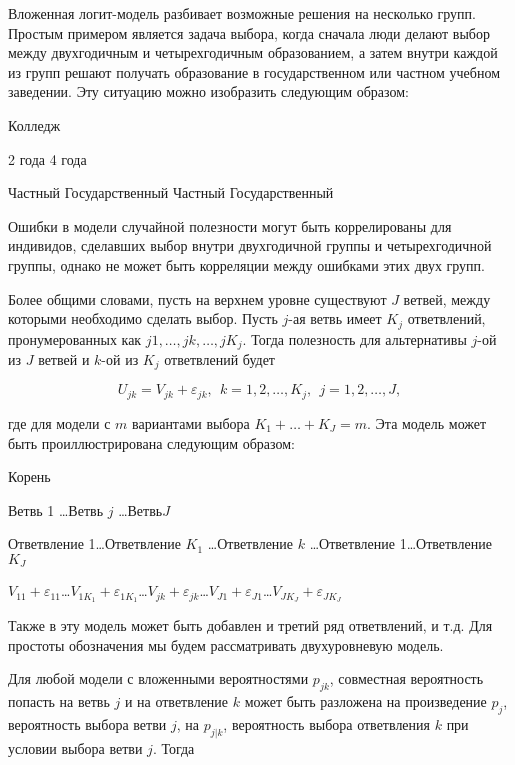 Вложенная логит-модель разбивает возможные решения на несколько групп. Простым примером является задача выбора, когда сначала люди делают выбор между двухгодичным и четырехгодичным образованием, а затем внутри каждой из групп решают получать образование в государственном или частном учебном заведении. Эту ситуацию можно изобразить следующим образом:


Колледж

2 года               4 года

Частный Государственный Частный Государственный



Ошибки в модели случайной полезности могут быть коррелированы для индивидов, сделавших выбор внутри двухгодичной группы  и четырехгодичной группы, однако не может быть корреляции между ошибками этих двух групп.

Более общими словами, пусть на верхнем уровне существуют $J$ ветвей, между которыми необходимо сделать выбор. Пусть $j$-ая ветвь имеет $K_j$ ответвлений, пронумерованных как $j1,\dots ,jk,\dots ,jK_j.$ Тогда полезность для альтернативы $j$-ой из $J$ ветвей и $k$-ой из $K_j$ ответвлений будет

\begin{equation} \label{GrindEQ__15_32_} U_{jk}=V_{jk}+{\varepsilon }_{jk},\ \ k=1,2,\dots ,K_j,\ \ j=1,2,\dots ,J, \end{equation} 

где для модели с $m$ вариантами выбора $K_1+\dots +K_J=m.$ Эта модель может быть проиллюстрирована следующим образом:

Корень



Ветвь 1  \dots  Ветвь $j$ \dots  Ветвь$J$



Ответвление 1\dots Ответвление $K_1$   \dots      Ответвление $k$      \dots      Ответвление 1\dots Ответвление $K_J$

$V_{11}+{\varepsilon }_{11}$\dots $V_{1K_1}+{\varepsilon }_{1K_1}$\dots $V_{jk}+{\varepsilon }_{jk}$\dots $V_{J1}+{\varepsilon }_{J1}$\dots $V_{JK_J}+{\varepsilon }_{JK_J}$

Также в эту модель может быть добавлен и третий ряд ответвлений, и т.д. Для простоты обозначения мы будем рассматривать двухуровневую модель.

Для любой модели с вложенными вероятностями $p_{jk}$, совместная вероятность попасть на ветвь $j$ и на ответвление $k$ может быть разложена на произведение $p_j$, вероятность выбора ветви $j$, на $p_{j|k}$, вероятность выбора ответвления $k$ при условии выбора ветви $j$. Тогда

